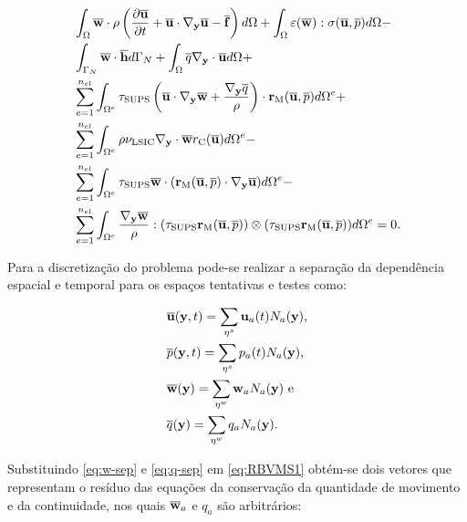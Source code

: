 \documentclass[_ArquivoPrincipal.tex]{subfiles}
\begin{document}
\begin{equation}
\begin{split}
    &\int_\Omega{\overline{\mathbf{w}}\cdot\rho\left({\frac{\partial{\overline{\mathbf{u}}}}{\partial{t}}+\overline{\mathbf{u}}\cdot\mathbf{\nabla_y}\overline{\mathbf{u}}-\overline{\mathbf{f}}}\right)d\Omega}+\int_\Omega{\mathbf{\varepsilon}(\overline{\mathbf{w}}):\mathbf{\sigma}(\overline{\mathbf{u}},\overline{p})d\Omega}-\\
    &\int_{\Gamma_N}{\overline{\mathbf{w}}\cdot\overline{\mathbf{h}}d\Gamma_N}+\int_\Omega{\overline{q}\mathbf{\nabla_y}\cdot\overline{\mathbf{u}}d\Omega}+\\
    &\sum_{e=1}^{n_{el}}{\int_{\Omega^e}{\tau_{\mathrm{SUPS}}\left({\overline{\mathbf{u}}\cdot\mathbf{\nabla_y}\overline{\mathbf{w}}+\frac{\mathbf{\nabla_y}\overline{q}}{\rho}}\right)\cdot\mathbf{r}_\mathrm{M}(\overline{\mathbf{u}},\overline{p}) d\Omega^e}}+\\
    &\sum_{e=1}^{n_{el}}{\int_{\Omega^e}{\rho\nu_{\mathrm{LSIC}}\mathbf{\nabla_y}\cdot\overline{\mathbf{w}}r_\mathrm{C}(\overline{\mathbf{u}}) d\Omega^e}}-\\
    &\sum_{e=1}^{n_{el}}{\int_{\Omega^e}{\tau_{\mathrm{SUPS}}\overline{\mathbf{w}}\cdot(\mathbf{r}_\mathrm{M}(\overline{\mathbf{u}},\overline{p})\cdot\mathbf{\nabla_y}\overline{\mathbf{u}})d\Omega^e}}-\\
    &\sum_{e=1}^{n_{el}}{\int_{\Omega^e}{
    \frac{\mathbf{\nabla_y}\overline{\mathbf{w}}}{\rho}:(\tau_{\mathrm{SUPS}}\mathbf{r}_\mathrm{M}(\overline{\mathbf{u}},\overline{p}))\otimes(\tau_{\mathrm{SUPS}}\mathbf{r}_\mathrm{M}(\overline{\mathbf{u}},\overline{p}))d\Omega^e}}=0
    \text{.}
    \label{eq:RBVMS1}
\end{split}
\end{equation}

Para a discretização do problema pode-se realizar a separação da dependência espacial e temporal para os espaços tentativas e testes como:

\begin{subequations}
    \begin{align}
        &\overline{\mathbf{u}}(\mathbf{y},t)=\sum_{\mathbf{\eta}^s}{\mathbf{u}_a(t)N_a(\mathbf{y})}\text{,}\\
        &\overline{p}(\mathbf{y},t)=\sum_{\mathbf{\eta}^s}{p_a(t)N_a(\mathbf{y})}\text{,}\\
        &\overline{\mathbf{w}}(\mathbf{y})=\sum_{\mathbf{\eta}^w}{\mathbf{w}_aN_a(\mathbf{y})}\text{ e}
        \label{eq:w-sep}\\
        &\overline{q}(\mathbf{y})=\sum_{\mathbf{\eta}^w}{q_aN_a(\mathbf{y})}\text{.}
        \label{eq:q-sep}
    \end{align}
\end{subequations}

Substituindo \ref{eq:w-sep} e \ref{eq:q-sep} em \ref{eq:RBVMS1} obtém-se dois vetores que representam o resíduo das equações da conservação da quantidade de movimento e da continuidade, nos quais $\overline{\mathbf{w}}_a$ e $q_a$ são arbitrários:
\end{document}
